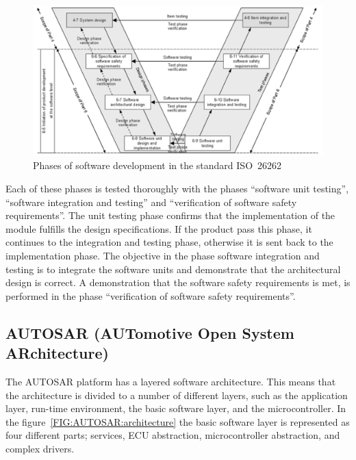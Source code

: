 \begin{figure}
  \includegraphics[keepaspectratio, width=\linewidth]{pictures/V}
  \caption{Phases of software development in the standard ISO~26262}
  \label{FIG:ISO:phases}
\end{figure}

Each of these phases is tested thoroughly with the phases ``software
unit testing'', ``software integration and testing'' and
``verification of software safety requirements''. The unit testing
phase confirms that the implementation of the module fulfills the
design specifications. If the product pass this phase, it continues to
the integration and testing phase, otherwise it is sent back to the
implementation phase. The objective in the phase software integration
and testing is to integrate the software units and demonstrate that
the architectural design is correct. A demonstration that the software
safety requirements is met, is performed in the phase ``verification
of software safety requirements''. \cite[6:5.4]{ISO26262}

\subsection{AUTOSAR (AUTomotive Open System ARchitecture)}
The AUTOSAR platform has a layered software architecture. This means
that the architecture is divided to a number of different layers, such
as the application layer, run-time environment, the basic software
layer, and the microcontroller. In the
figure~\ref{FIG:AUTOSAR:architecture} the basic software layer is
represented as four different parts; services, ECU abstraction,
microcontroller abstraction, and complex
drivers. \cite{AUTOSAR:LayeredSoftwareArchitecture}

